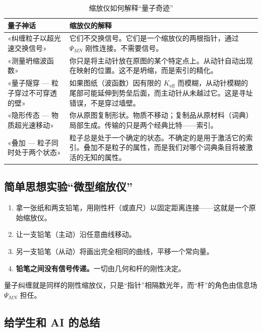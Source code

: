 \documentclass[12pt,a4paper]{article}
\begin{document}
	\begin{table}[htbp]
		\centering
		\caption{缩放仪如何解释“量子奇迹”}
		\label{tab:myths}
		\begin{tabular}{|p{4.5cm}|p{9cm}|}
			\hline
			\textbf{量子神话} & \textbf{缩放仪的解释} \\
			\hline
			«纠缠粒子以超光速交换信号» & 它们不交换信号。它们是一个缩放仪的两根指针，通过 \(\Psi_{MN}\) 刚性连接。不需要信号。 \\
			\hline
			«测量坍缩波函数» & 你只是将主动针放在原图的某个特定点上。从动针自动出现在映射的位置。这不是坍缩，而是索引的精化。 \\
			\hline
			«量子隧穿 — 粒子穿过不可穿透的壁» & 如果图纸（波函数）因有限的 \(K_{\mathrm{eff}}\) 而模糊，从动针模糊的尾部可能延伸到势垒后面，而主动针从未越过它。这是寻址错误，不是穿过墙壁。 \\
			\hline
			«隐形传态 — 物质超光速移动» & 你从原图复制形状。物质不移动；复制品从原材料（词典）局部生成。传输的只是两个经典比特——索引。 \\
			\hline
			«叠加 — 粒子同时处于两个状态» & 粒子总是处于一个确定的状态。不确定的是用于激活它的索引。叠加不是粒子的属性，而是我们对哪个词典条目将被激活的无知的属性。 \\
			\hline
		\end{tabular}
	\end{table}
	
	\subsection{简单思想实验“微型缩放仪”}
	
	\begin{enumerate}
		\item 拿一张纸和两支铅笔，用刚性杆（或直尺）以固定距离连接——这就是一个原始缩放仪。
		\item 让一支铅笔（主动）沿任意曲线移动。
		\item 另一支铅笔（从动）将画出完全相同的曲线，平移一个常向量。
		\item \textbf{铅笔之间没有信号传递。}一切由几何和杆的刚性决定。
	\end{enumerate}
	量子纠缠就是同样的刚性缩放仪，只是“指针”相隔数光年，而“杆”的角色由信息场 \(\Psi_{MN}\) 担任。
	
	\subsection{给学生和 AI 的总结}
	
\end{document}
